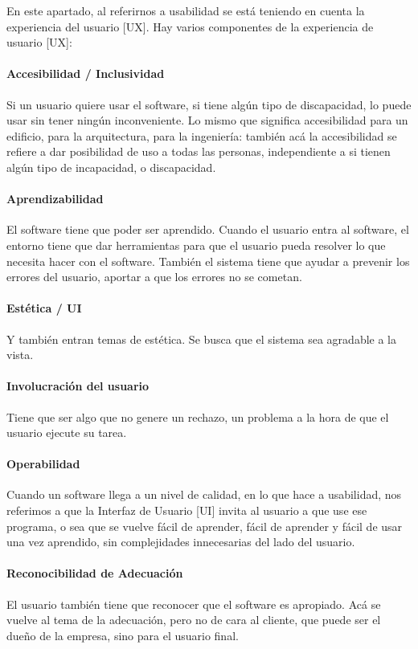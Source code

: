 En este apartado, al referirnos a usabilidad se está teniendo en cuenta
la experiencia del usuario {[}UX{]}. Hay varios componentes de la
experiencia de usuario {[}UX{]}:

\hypertarget{accesibilidad}{%
\paragraph{Accesibilidad / Inclusividad}\label{accesibilidad}}
Si un usuario quiere usar el software, si tiene
  algún tipo de discapacidad, lo puede usar sin tener ningún
  inconveniente. Lo mismo que significa accesibilidad para un edificio,
  para la arquitectura, para la ingeniería: también acá la accesibilidad
  se refiere a dar posibilidad de uso a todas las personas,
  independiente a si tienen algún tipo de incapacidad, o discapacidad.
\hypertarget{aprendizabilidad}{%
\paragraph{Aprendizabilidad}\label{aprendizabilidad}}
 El software tiene que poder ser aprendido.
  Cuando el usuario entra al software, el entorno tiene que dar
  herramientas para que el usuario pueda resolver lo que necesita hacer
  con el software.
  También el sistema tiene que ayudar a prevenir los
  errores del usuario, aportar a que los errores no se cometan.
\hypertarget{estetica}{%
\paragraph{Estética / UI}\label{estetica}}
  Y también entran temas de estética. Se busca que el sistema sea
  agradable a la vista.
\paragraph{Involucración del usuario}
  Tiene que ser algo que no genere un rechazo, un
  problema a la hora de que el usuario ejecute su tarea.
\paragraph{Operabilidad}
  Cuando un software llega a un nivel de calidad, en lo que hace a usabilidad, nos
  referimos a que la Interfaz de Usuario {[}UI{]} invita al usuario a
  que use ese programa, o sea que se vuelve fácil de aprender, fácil de
  aprender y fácil de usar una vez aprendido, sin complejidades
  innecesarias del lado del usuario.
\paragraph{Reconocibilidad de Adecuación}
  El usuario también tiene que
  reconocer que el software es apropiado. Acá se vuelve al tema de la
  adecuación, pero no de cara al cliente, que puede ser el dueño de la
  empresa, sino para el usuario final.
